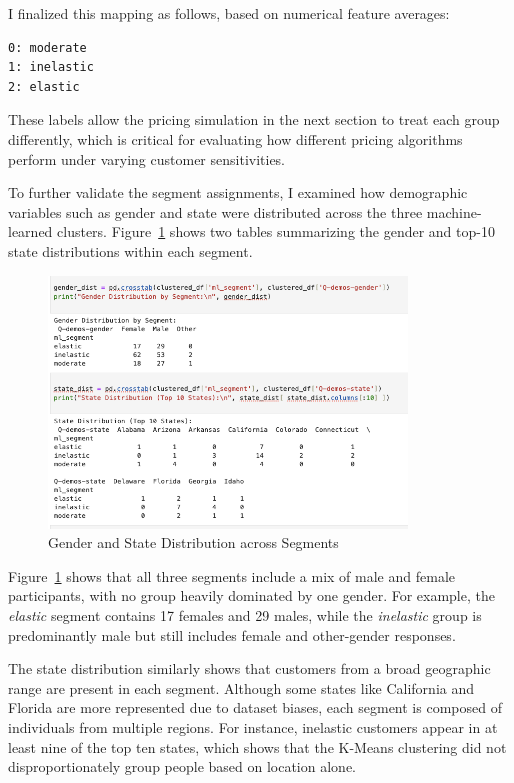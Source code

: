 \documentclass[12pt]{article}
\begin{document}
I finalized this mapping as follows, based on numerical feature averages:

\begin{verbatim}
0: moderate
1: inelastic
2: elastic
\end{verbatim}

These labels allow the pricing simulation in the next section to treat each group differently, which is critical for evaluating how different pricing algorithms perform under varying customer sensitivities.

To further validate the segment assignments, I examined how demographic variables such as gender and state were distributed across the three machine-learned clusters. Figure~\ref{fig:gender-state} shows two tables summarizing the gender and top-10 state distributions within each segment. 

\begin{figure}[h!]
  \centering
  \includegraphics[width=0.85\textwidth]{figures/gender and state dist by segment.png}
  \caption{Gender and State Distribution across Segments}
  \label{fig:gender-state}
\end{figure}

Figure~\ref{fig:gender-state} shows that all three segments include a mix of male and female participants, with no group heavily dominated by one gender. For example, the \textit{elastic} segment contains 17 females and 29 males, while the \textit{inelastic} group is predominantly male but still includes female and other-gender responses.

The state distribution similarly shows that customers from a broad geographic range are present in each segment. Although some states like California and Florida are more represented due to dataset biases, each segment is composed of individuals from multiple regions. For instance, inelastic customers appear in at least nine of the top ten states, which shows that the K-Means clustering did not disproportionately group people based on location alone.
\end{document}
